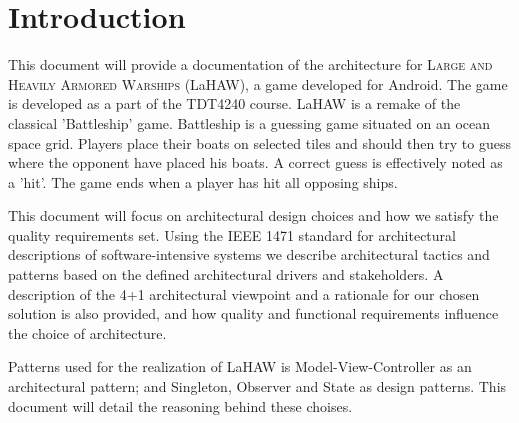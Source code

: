 \chapter{Introduction}
This document will provide a documentation of the architecture for \textsc{Large and Heavily Armored Warships} (LaHAW), a game developed for Android. The game is developed as a part of the TDT4240 course.
LaHAW is a remake of the classical 'Battleship' game\cite{battleship}. Battleship is a guessing game situated on an ocean space grid. Players place their boats on selected tiles and should then try to guess where the opponent
have placed his boats. A correct guess is effectively noted as a 'hit'. The game ends when a player has hit all opposing ships.

This document will focus on architectural design choices and how we satisfy the quality requirements set.
Using the IEEE 1471 standard for architectural descriptions of software-intensive systems\cite{IEEE1471} we describe architectural tactics and patterns based on the defined architectural drivers and stakeholders. A description of the 4+1 architectural viewpoint\cite{4+1} and a rationale for our chosen solution is also provided, and how quality and functional requirements influence the choice of architecture.

Patterns used for the realization of LaHAW is Model-View-Controller as an architectural pattern; and Singleton, Observer and State as design patterns. This document will detail the reasoning behind these choises.